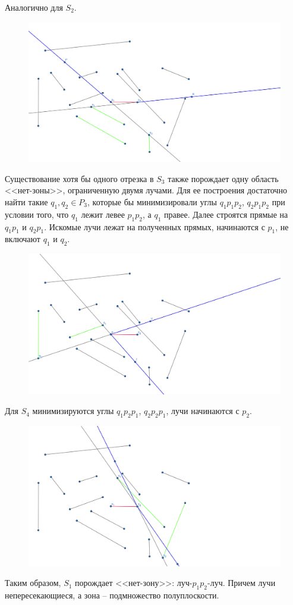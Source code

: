 \documentclass[letterpaper,12pt]{article}
\begin{document}
Аналогично для $S_2$.
\begin{figure}[H]
      \centering
      \includegraphics[width=0.5\linewidth]{rays_2.png}
\end{figure}
\par
Существование хотя бы одного отрезка в $S_3$ также порождает
одну область <<нет-зоны>>, ограниченную двумя лучами.
Для ее построения достаточно найти такие  $q_1, q_2 \in P_3$,
которые бы минимизировали углы $q_1 p_1 p_2$, $q_2 p_1 p_2$
при условии того, что $q_1$ лежит левее $p_1 p_2$, а $q_1$
правее. Далее строятся прямые на $q_1 p_1$ и $q_2 p_1$. 
Искомые лучи лежат на полученных прямых, начинаются с 
$p_1$, не включают $q_1$ и $q_2$.
\begin{figure}[H]
      \centering
      \includegraphics[width=0.5\linewidth]{rays_3.png}
\end{figure}
\par
Для $S_4$ минимизируются углы $q_1 p_2 p_1$, $q_2 p_2 p_1$,
лучи начинаются с $p_2$.
\begin{figure}[H]
      \centering
      \includegraphics[width=0.5\linewidth]{rays_4.png}
\end{figure}
\par
Таким образом, $S_1$ порождает <<нет-зону>>: 
луч-$p_1 p_2$-луч. Причем лучи непересекающиеся, 
а зона -- подмножество полуплоскости. %
\end{document}
